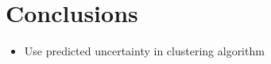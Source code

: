 
\section{Conclusions}
\begin{itemize}
\item Use predicted uncertainty in clustering algorithm
\end{itemize}
